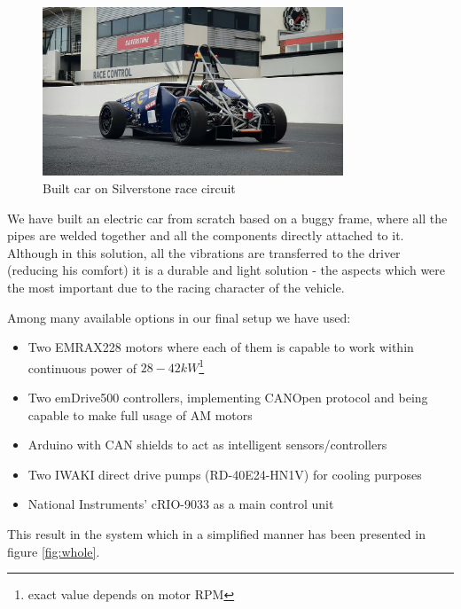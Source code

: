 \begin{figure}[b]
    \centering
        \includegraphics[width=0.8\textwidth]{figures/silverstone.jpg}
        \caption{Built car on Silverstone race circuit}
        \label{pic:silverstone}
\end{figure}


We have built an electric car from scratch based on a buggy frame, where all the pipes are welded together and all the components directly attached to it. Although in this solution, all the vibrations are transferred to the driver (reducing his comfort) it is a durable and light solution - the aspects which were the most important due to the racing character of the vehicle. 

Among many available options in our final setup we have used:
\begin{itemize}
    \item Two EMRAX228 motors where each of them is capable to work within continuous power of $28-42kW$\footnote{exact value depends on motor RPM}\cite{emrax_manual}
    \item Two emDrive500 controllers, implementing CANOpen protocol and being capable to make full usage of AM motors
    \item Arduino with CAN shields to act as intelligent sensors/controllers
    \item Two IWAKI direct drive pumps (RD-40E24-HN1V) for cooling purposes %
    \item National Instruments' cRIO-9033 as a main control unit
\end{itemize}
\newpage
This result in the system which in a simplified manner has been presented in figure \ref{fig:whole}.

